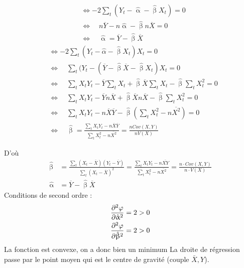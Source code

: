 \documentclass{article}
\begin{document}
\begin{multicols}{2}
\begin{equation*}
\begin{split}
	&\Leftrightarrow -2 \sum_t (Y_t - \hat{\upalpha} - \hat{\upbeta} X_t ) = 0 \\
	&\Leftrightarrow \quad n \overline{Y} - n \hat{\upalpha} - \hat{\upbeta} n \overline{X} = 0 \\
	&\Leftrightarrow \quad \hat{\upalpha} = \overline{Y} - \hat{\upbeta}  \overline{X}
\end{split}
\end{equation*}
\columnbreak
\begin{equation*}
\begin{split}
 	&\Leftrightarrow-2 \sum_t (Y_t - \hat{\alpha} - \hat{\upbeta} X_t) X_t = 0 \\
	&\Leftrightarrow \quad \sum_t (Y_t - (\overline{Y} - \hat{\upbeta} \overline{X} - \hat{\upbeta} X_t) X_t = 0 \\
	&\Leftrightarrow \quad \sum_t X_tY_t - \overline{Y} \sum_t X_t + \hat{\upbeta} \overline{X} \sum_t X_t - \hat{\upbeta} \sum_t X_t^2 = 0\\
	&\Leftrightarrow \quad \sum_t X_tY_t - \overline{Y} n \overline{X} + \hat{\upbeta} \overline{X} n \overline{X} - \hat{\upbeta} \sum_t X_t^2 = 0 \\
	&\Leftrightarrow \quad \sum_t X_tY_t - n \overline{X} \overline{Y} - \hat{\upbeta} (\sum_t X_t^2 -n \overline{X^2}) = 0 \\
	&\Leftrightarrow \quad \hat{\upbeta} = \frac{\sum_t X_tY_t - n \overline{X} \overline{Y}}{\sum_t X_t^2 -n \overline{X^2}} = \frac{n Cov(X,Y)}{n V(X)}
\end{split}
\end{equation*}
\end{multicols}
D'où
{\color{red}
\begin{equation*}
\begin{split}
    \hat{\upbeta} &= \frac{\sum_t \left( X_t - \overline{X}\right)\left( Y_t - \overline{Y} \right)}{\sum_t\left( X_t - \overline{X} \right)^2 } = \frac{\sum_t X_tY_t - n\overline{XY}}{\sum_t X_t^2 - n\overline{X^2}} = \frac{n \cdot Cov(X,Y)}{n \cdot V(X)} \\
    \hat{\upalpha} &= \overline{Y} - \hat{\upbeta} \overline{X}
\end{split}
\end{equation*}}
Conditions de second ordre : 
\begin{equation*}
\begin{split}
	\pdv[2]{\varphi}{\hat{\upalpha}} &= 2 >0 \\
	\pdv[2]{\varphi}{\hat{\upbeta}} &= 2 >0
\end{split}
\end{equation*}
La fonction est convexe, on a donc bien un minimum 
\newpage
La droite de régression passe par le point moyen qui est le centre de gravité (couple \(\bar{X},Y\)).
\end{document}

